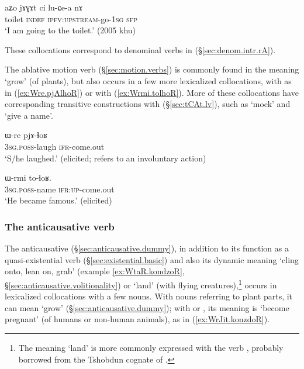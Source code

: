  \begin{exe}
	\ex \label{ex:jAGAt.luCea}
	\gll  aʑo jɤɣɤt ci lu-ɕe-a nɤ \\
		 toilet \textsc{indef} \textsc{ipfv}:\textsc{upstream}-go-\textsc{1sg} \textsc{sfp} \\
	\glt `I am going to the toilet.' (2005 khu) 
\end{exe}

These collocations correspond to denominal verbs in  (§\ref{sec:denom.intr.rA}).


The ablative motion verb  (§\ref{sec:motion.verbs}) is commonly found in the meaning `grow' (of plants), but also occurs in a few more lexicalized collocations, with  as in (\ref{ex:Wre.pjAlhoR}) or with  (\ref{ex:Wrmi.tolhoR}). More of these collocations have corresponding transitive constructions with  (§\ref{sec:tCAt.lv}), such as  `mock' and  `give a name'.

\begin{exe}
\ex \label{ex:Wre.pjAlhoR}
\gll ɯ-re pjɤ-ɬoʁ \\
\textsc{3sg}.\textsc{poss}-laugh \textsc{ifr}-come.out \\
\glt `S/he laughed.' (elicited; refers to an involuntary action)
\end{exe}

\begin{exe}
\ex \label{ex:Wrmi.tolhoR}
\gll ɯ-rmi to-ɬoʁ. \\
\textsc{3sg}.\textsc{poss}-name \textsc{ifr}:\textsc{up}-come.out \\
\glt `He became famous.' (elicited)
\end{exe}

 \subsubsection{The anticausative verb } \label{sec:ndzoR.light.verbs}
The anticausative  (§\ref{sec:anticausative.dummy}), in addition to its function as a quasi-existential verb (§\ref{sec:existential.basic}) and also its dynamic meaning  `cling onto, lean on, grab' (example \ref{ex:WtaR.kondzoR}, §\ref{sec:anticausative.volitionality}) or `land' (with flying creatures),\footnote{The meaning `land' is more commonly expressed with the verb , probably borrowed from the Tshobdun cognate of . } occurs in lexicalized collocations with a few nouns.  With nouns referring to  plant parts, it can mean `grow' (§\ref{sec:anticausative.dummy}); with  or , its meaning is `become pregnant' (of humans or non-human animals), as in (\ref{ex:WrJit.konzdoR}).

